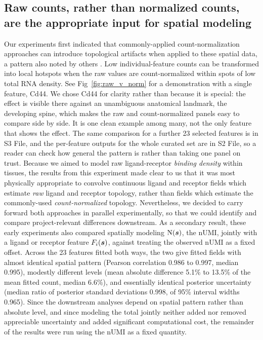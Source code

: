 \documentclass[10pt,letterpaper]{article}
\begin{document}
\subsection*{Raw counts, rather than normalized counts, are the appropriate input for spatial modeling}

Our experiments first indicated that commonly-applied count-normalization approaches can introduce topological artifacts when applied to these spatial data, a pattern also noted by others \cite{Bhuva2024}. Low individual-feature counts  can be transformed into local hotspots when the raw values are count-normalized within spots of low total RNA density. See Fig~\ref{fig:raw_v_norm} for a demonstration with a single feature, Cd44. We chose Cd44 for clarity rather than because it is special: the effect is visible there against an unambiguous anatomical landmark, the developing spine, which makes the raw and count-normalized panels easy to compare side by side. It is one clean example among many, not the only feature that shows the effect. The same comparison for a further 23 selected features is in S3 File, and the per-feature outputs for the whole curated set are in S2 File, so a reader can check how general the pattern is rather than taking one panel on trust. Because we aimed to model raw ligand-receptor \textit{binding density} within tissues, the results from this experiment made clear to us that it was most physically appropriate to convolve continuous ligand and receptor fields which estimate \textit{raw} ligand and receptor topology, rather than fields which estimate the commonly-used \textit{count-normalized} topology. Nevertheless, we decided to carry forward both approaches in parallel experimentally, so that we could identify and compare project-relevant differences downstream. As a secondary result, these early experiments also compared spatially modeling $\mbox{N}(\mbox{\boldmath $s$})$, the nUMI, jointly with a ligand or receptor feature $F_i(\mbox{\boldmath $s$})$, against treating the observed nUMI as a fixed offset. Across the 23 features fitted both ways, the two give fitted fields with almost identical spatial pattern (Pearson correlation 0.986 to 0.997, median 0.995), modestly different levels (mean absolute difference 5.1\% to 13.5\% of the mean fitted count, median 6.6\%), and essentially identical posterior uncertainty (median ratio of posterior standard deviations 0.998, of 95\% interval widths 0.965). Since the downstream analyses depend on spatial pattern rather than absolute level, and since modeling the total jointly neither added nor removed appreciable uncertainty and added significant computational cost, the remainder of the results were run using the nUMI as a fixed quantity.
\end{document}
